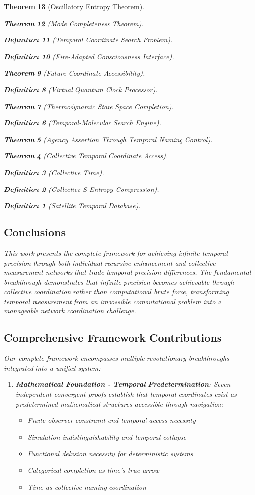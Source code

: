 \documentclass[12pt,a4paper]{article}
\newtheorem{theorem}{Theorem}[section]
\newtheorem{definition}[theorem]{Definition}
\begin{document}
\begin{theorem}[Oscillatory Entropy Theorem]
\begin{theorem}[Mode Completeness Theorem]
\begin{enumerate}
\begin{definition}[Temporal Coordinate Search Problem]
\begin{algorithm}
\begin{definition}[Fire-Adapted Consciousness Interface]
\begin{theorem}[Future Coordinate Accessibility]
\begin{definition}[Virtual Quantum Clock Processor]
\begin{itemize}
\begin{itemize}
\begin{theorem}[Thermodynamic State Space Completion]
\begin{definition}[Temporal-Molecular Search Engine]
\begin{theorem}[Agency Assertion Through Temporal Naming Control]
\begin{remark}
\begin{theorem}[Collective Temporal Coordinate Access]
\begin{definition}[Collective Time]
\begin{definition}[Collective S-Entropy Compression]
\begin{definition}[Satellite Temporal Database]
\begin{algorithm}
\begin{table}[h]
{{\section{Conclusions}

This work presents the complete framework for achieving infinite temporal precision through both individual recursive enhancement and collective measurement networks that trade temporal precision differences. The fundamental breakthrough demonstrates that infinite precision becomes achievable through collective coordination rather than computational brute force, transforming temporal measurement from an impossible computational problem into a manageable network coordination challenge.

\subsection{Comprehensive Framework Contributions}

Our complete framework encompasses multiple revolutionary breakthroughs integrated into a unified system:

\begin{enumerate}
\item \textbf{Mathematical Foundation - Temporal Predetermination}: Seven independent convergent proofs establish that temporal coordinates exist as predetermined mathematical structures accessible through navigation:
\begin{itemize}
    \item Finite observer constraint and temporal access necessity
    \item Simulation indistinguishability and temporal collapse
    \item Functional delusion necessity for deterministic systems
    \item Categorical completion as time's true arrow
    \item Time as collective naming coordination
\end{itemize}


\end{enumerate}}}
\end{table}
\end{algorithm}
\end{definition}
\end{definition}
\end{definition}
\end{theorem}
\end{remark}
\end{theorem}
\end{definition}
\end{theorem}
\end{itemize}
\end{itemize}
\end{definition}
\end{theorem}
\end{definition}
\end{algorithm}
\end{definition}
\end{enumerate}
\end{theorem}
\end{theorem}
\end{document}

